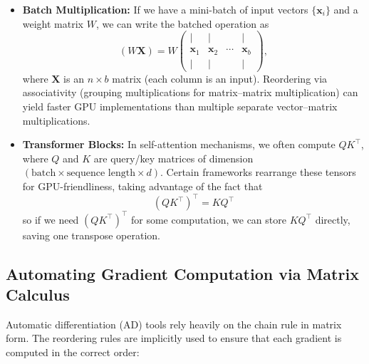\begin{itemize}
    \item \textbf{Batch Multiplication:} 
          If we have a mini-batch of input vectors $\{\mathbf{x}_i\}$ and a weight matrix $W$, 
          we can write the batched operation as
          \[
             (W \mathbf{X}) = W 
             \begin{pmatrix}
             | & | &  & | \\
             \mathbf{x}_1 & \mathbf{x}_2 & \cdots & \mathbf{x}_b \\
             | & | &  & |
             \end{pmatrix},
          \]
          where $\mathbf{X}$ is an $n \times b$ matrix (each column is an input).  
          Reordering via associativity (grouping multiplications for matrix--matrix multiplication) 
          can yield faster GPU implementations than multiple separate vector--matrix multiplications.

    \item \textbf{Transformer Blocks:} 
          In self-attention mechanisms, we often compute $QK^\top$, where $Q$ and $K$ 
          are query/key matrices of dimension $(\text{batch} \times \text{sequence length} \times d)$. 
          Certain frameworks rearrange these tensors for GPU-friendliness, 
          taking advantage of the fact that
          \[
          (Q K^\top)^\top = K Q^\top
          \]
          so if we need $(Q K^\top)^\top$ for some computation, we can store $K Q^\top$ directly, 
          saving one transpose operation.
\end{itemize}

\subsection{Automating Gradient Computation via Matrix Calculus}
Automatic differentiation (AD) tools rely heavily on the chain rule in matrix form. 
The reordering rules are implicitly used to ensure that each gradient is computed in the 
correct order:

